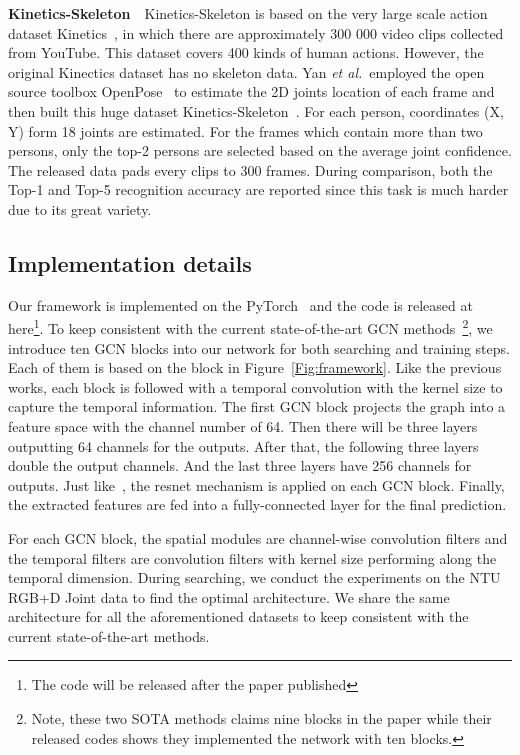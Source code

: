 \documentclass[letterpaper]{article} \usepackage{aaai19}  \usepackage{times}  \usepackage{helvet} \usepackage{courier}  \usepackage[hyphens]{url}  \usepackage{graphicx} \urlstyle{rm} \def\UrlFont{\rm}  \usepackage{graphicx}  \frenchspacing  \setlength{\pdfpagewidth}{8.5in}  \setlength{\pdfpageheight}{11in}
\def\etal{\emph{et al.}}
\begin{document}
\noindent \textbf{Kinetics-Skeleton}~~Kinetics-Skeleton is based on the very large scale action dataset Kinetics~\cite{kay2017kinetics}, in which there are approximately 300 000 video clips collected from YouTube. This dataset covers 400 kinds of human actions. However, the original Kinectics dataset has no skeleton data. Yan \etal~employed the open source toolbox OpenPose~\cite{Cao_2017} to estimate the 2D joints location of each frame and then built this huge dataset Kinetics-Skeleton~\cite{yan2018stgan}. For each person, coordinates (X, Y) form 18 joints are estimated. For the frames which contain more than two persons, only the top-2 persons are selected based on the average joint confidence. The released data pads every clips to 300 frames. During comparison, both the Top-1 and Top-5 recognition accuracy are reported since this task is much harder due to its great variety.
\subsection{Implementation details} 
Our framework is implemented on the PyTorch~\cite{paszke2017automatic} and the code is released at here\footnote{The code will be released after the paper published}. To keep consistent with the current state-of-the-art GCN methods~\cite{yan2018stgan,shi2019two}\footnote{Note, these two SOTA methods claims nine blocks in the paper while their released codes shows they implemented the network with ten blocks.}, we introduce ten GCN blocks into our network for both searching and training steps. Each of them is based on the block in Figure~\ref{Fig:framework}. Like the previous works, each block is followed with a temporal convolution with the kernel size  to capture the temporal information. The first GCN block projects the graph into a feature space with the channel number of 64. Then there will be three layers outputting 64 channels for the outputs. After that, the following three layers double the output channels. And the last three layers have 256 channels for outputs. Just like~\cite{yan2018stgan}, the resnet mechanism is applied on each GCN block. Finally, the extracted features are fed into a fully-connected layer for the final prediction.  

For each GCN block, the spatial modules  are channel-wise convolution filters and the temporal filters  are convolution filters with kernel size  performing along the temporal dimension. During searching, we conduct the experiments on the NTU RGB+D Joint data to find the optimal architecture. We share the same architecture for all the aforementioned datasets to keep consistent with the current state-of-the-art methods. 
\end{document}
